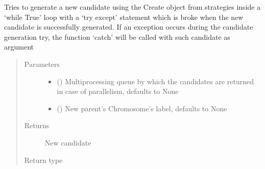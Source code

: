 \documentclass[letterpaper,10pt,english]{sphinxmanual}
\begin{document}
\begin{fulllineitems}
\begin{quote}
\begin{description}
\end{description}\end{quote}

\begin{fulllineitems}
\label{\detokenize{MolOpt.genetic:MolOpt.genetic.genetic.Genetic.__generate_parent}}
\sphinxAtStartPar
Tries to generate a new candidate using the Create object from strategies inside a ‘while True’ loop with a 
‘try except’ statement which is broke when the new candidate is successfully generated. If an exception occurs 
during the candidate generation try, the function ‘catch’ will be called with such candidate as argument
\begin{quote}\begin{description}
\item[{Parameters}] \leavevmode\begin{itemize}
\item {} 
\sphinxAtStartPar
{} (\sphinxstyleliteralemphasis{\sphinxupquote{, }}) \textendash{} Multiprocessing queue by which the candidates are returned in case of parallelism, defaults to 
None

\item {} 
\sphinxAtStartPar
{} (\sphinxstyleliteralemphasis{\sphinxupquote{, }}) \textendash{} New parent’s Chromosome’s label, defaults to None

\end{itemize}

\item[{Returns}] \leavevmode
\sphinxAtStartPar
New candidate

\item[{Return type}] \leavevmode
\sphinxAtStartPar
{\hyperref[\detokenize{MolOpt.genetic:MolOpt.genetic.genetic.Chromosome}]{}}


\end{description}
\end{quote}
\end{fulllineitems}
\end{fulllineitems}
\end{document}
